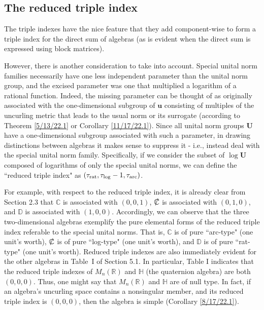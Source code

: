 \documentclass{amsart}
\numberwithin{equation}{section}
\theoremstyle{definition}
\numberwithin{theorem}{section}
\begin{document}
\subsection{The reduced triple index}
The triple indexes have the nice feature that they add component-wise to form a triple index for the direct sum of algebras (as is evident when the direct sum is expressed using block matrices).
 
However, there is another consideration to take into account. Special unital norm families necessarily have one less independent parameter than the unital norm group, and the excised parameter was one that multiplied a logarithm of a rational function.  Indeed, the missing parameter can be thought of as originally associated with the one-dimensional subgroup of $\mathbf{u}$ consisting of multiples of the uncurling metric that leads to the usual norm or its surrogate (according to Theorem \ref{5/13/22.1} or Corollary \ref{11/17/22.1}).  Since all unital norm groups $\mathbf{U}$ have a one-dimensional subgroup associated with such a parameter, in drawing distinctions between algebras it makes sense to suppress it - i.e., instead deal with the special unital norm family.  Specifically, if we consider the subset of $\log \mathbf{U}$ composed of logarithms of only the special unital norms, we can define the ``reduced triple index" as $(\tau_{\rm rat},\tau_{\rm log}-1,\tau_{\rm arc})$.
 
For example, with respect to the reduced triple index, it is already clear from Section 2.3 that $\mathbb{C}$ is associated with $(0,0,1)$, $\slashed{\mathbb{C}}$ is associated with $(0,1,0)$, and $\mathbb{D}$ is associated with $(1,0,0)$.  Accordingly, we can observe that the three \mbox{two-dimensional} algebras exemplify the pure elemental forms of the reduced triple index referable to the special unital norms.  That is, $\mathbb{C}$ is of pure ``arc-type" (one unit's worth), $\slashed{\mathbb{C}}$ is of pure ``log-type" (one unit's worth), and $\mathbb{D}$ is of pure ``rat-type" (one unit's worth).  Reduced triple indexes are also immediately evident for the other algebras in \mbox{Table I} of Section 5.1.  In particular, Table I indicates that the reduced triple indexes of $M_n(\mathbb{R})$ and $\mathbb{H}$ (the quaternion algebra) are both $(0,0,0)$.  
 Thus, one might say that $M_n(\mathbb{R})$ and $\mathbb{H}$ are of null type.  In fact, if an algebra's uncurling space contains a nonsingular member, and its reduced triple index is $(0,0,0)$, then the algebra is simple (Corollary \ref{8/17/22.1}). 
 
\end{document}
